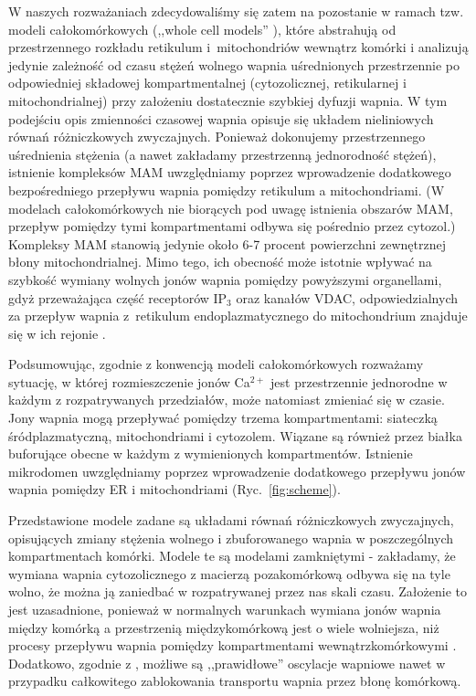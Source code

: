 W naszych rozważaniach zdecydowaliśmy się zatem na pozostanie w ramach tzw. modeli całokomórkowych (,,whole cell models'' \cite{Keener2009}), które abstrahują od przestrzennego rozkładu retikulum i~mitochondriów wewnątrz komórki i analizują jedynie zależność od czasu stężeń wolnego wapnia uśrednionych przestrzennie po odpowiedniej składowej kompartmentalnej (cytozolicznej, retikularnej i mitochondrialnej) przy założeniu dostatecznie szybkiej dyfuzji wapnia. W tym podejściu opis zmienności czasowej wapnia opisuje się układem nieliniowych równań różniczkowych zwyczajnych. Ponieważ dokonujemy przestrzennego uśrednienia stężenia (a nawet zakładamy przestrzenną jednorodność stężeń), istnienie kompleksów MAM uwzględniamy poprzez wprowadzenie dodatkowego bezpośredniego przepływu wapnia pomiędzy retikulum a mitochondriami. (W modelach całokomórkowych nie biorących pod uwagę istnienia obszarów MAM, przepływ pomiędzy tymi kompartmentami odbywa się pośrednio przez cytozol.) Kompleksy MAM stanowią jedynie około 6-7 procent powierzchni zewnętrznej błony mitochondrialnej. Mimo tego, ich obecność może istotnie wpływać na szybkość wymiany wolnych jonów wapnia pomiędzy powyższymi organellami, gdyż przeważająca część receptorów IP$_3$ oraz kanałów VDAC, odpowiedzialnych za przepływ wapnia z~retikulum endoplazmatycznego do mitochondrium znajduje się w ich rejonie \cite{Gunter2000}. 

\medskip 

Podsumowując, zgodnie z konwencją modeli całokomórkowych rozważamy sytuację, w której rozmieszczenie jonów Ca$^{2+}$ jest przestrzennie jednorodne w każdym z rozpatrywanych przedziałów, może natomiast zmieniać się w czasie. Jony wapnia mogą przepływać pomiędzy trzema kompartmentami: siateczką śródplazmatyczną, mitochondriami i cytozolem. Wiązane są również przez białka buforujące obecne w każdym z wymienionych kompartmentów. Istnienie mikrodomen uwzględniamy poprzez wprowadzenie dodatkowego przepływu jonów wapnia pomiędzy ER i mitochondriami (Ryc.~\ref{fig:scheme}). 

Przedstawione modele zadane są układami równań różniczkowych zwyczajnych, opisujących zmiany stężenia wolnego i zbuforowanego wapnia w poszczególnych kompartmentach komórki. Modele te są modelami zamkniętymi - zakładamy, że wymiana wapnia cytozolicznego z macierzą pozakomórkową odbywa się na tyle wolno, że można ją zaniedbać w rozpatrywanej przez nas skali czasu. Założenie to jest uzasadnione, ponieważ w normalnych warunkach wymiana jonów wapnia między komórką a przestrzenią międzykomórkową jest o wiele wolniejsza, niż procesy przepływu wapnia pomiędzy kompartmentami wewnątrzkomórkowymi \cite{Sneyd2004}. Dodatkowo, zgodnie z \cite{Sneyd2004}, możliwe są ,,prawidłowe'' oscylacje wapniowe nawet w przypadku całkowitego zablokowania transportu wapnia przez błonę komórkową.


